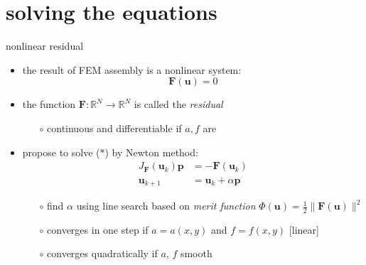 \documentclass[hide notes,intlimits,usenames,dvipsnames]{beamer}
\newcommand{\RR}{\mathbb{R}}
\newcommand{\bF}{\mathbf{F}}
\newcommand{\bp}{\mathbf{p}}
\newcommand{\bu}{\mathbf{u}}
\begin{document}
\section{solving the equations}

\begin{frame}{nonlinear residual}
\begin{itemize}
\item the result of FEM assembly is a nonlinear system:
\begin{equation*}
\bF(\bu)=0  \tag{$\ast$}
\end{equation*}
\item the function $\bF:\RR^N \to \RR^N$ is called the  \emph{residual}
    \begin{itemize}
    \item[$\circ$] continuous and differentiable if $a,f$ are
    \end{itemize}
\item propose to solve ($\ast$) by Newton method:
\begin{align*}
    J_\bF(\bu_k) \bp &= - \bF(\bu_k)  \\
    \bu_{k+1} &= \bu_k + \alpha \bp
\end{align*}

\vspace{-2mm}
    \begin{itemize}
    \item[$\circ$] find $\alpha$ using line search based on \emph{merit function} $\Phi(\bu)=\frac{1}{2}\|\bF(\bu)\|^2$
    \item[$\circ$] converges in one step if $a=a(x,y)$ and $f=f(x,y)$ [linear]
    \item[$\circ$] converges quadratically if $a$, $f$ smooth
    \end{itemize}
\end{itemize}
\end{frame}
\end{document}
